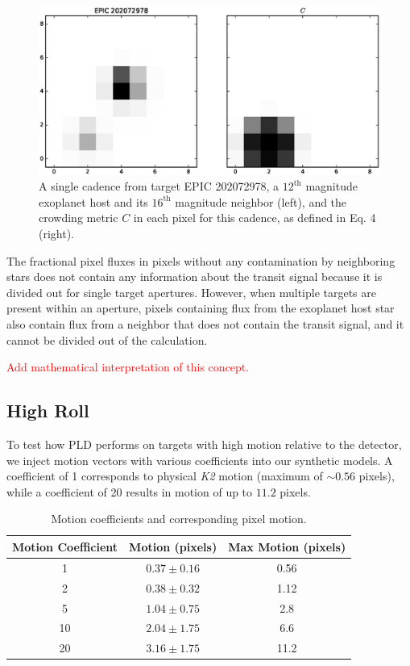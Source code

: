 \documentclass[12pt,preprint]{aastex}
\begin{document}
\begin{figure}[h]
	\centering
	\includegraphics[width=1.0\linewidth]{cr.eps}
	\caption{A single cadence from target EPIC 202072978, a $12^{\text{th}}$ magnitude exoplanet host and its $16^{\text{th}}$ magnitude neighbor (left), and the crowding metric $C$ in each pixel for this cadence, as defined in Eq. 4 (right).}
	\label{fig:crowding}
\end{figure}

The fractional pixel fluxes in pixels without any contamination by neighboring stars does not contain any information about the transit signal because it is divided out for single target apertures. However, when multiple targets are present within an aperture, pixels containing flux from the exoplanet host star also contain flux from a neighbor that does not contain the transit signal, and it cannot be divided out of the calculation.

\textcolor{red}{Add mathematical interpretation of this concept.}

\subsection{High Roll}

To test how PLD performs on targets with high motion relative to the detector, we inject motion vectors with various coefficients into our synthetic models. A coefficient of 1 corresponds to physical \textit{K2} motion (maximum of $\sim 0.56$ pixels), while a coefficient of 20 results in motion of up to $11.2$ pixels.

\begin{table}[h!]
\begin{center}
    \begin{tabular}{c | c | c}
        Motion Coefficient & Motion (pixels) & Max Motion (pixels) \\
        \hline \hline
        1 & $0.37\pm0.16$ & 0.56 \\
        2 & $0.38\pm0.32$ & 1.12 \\
				5 & $1.04\pm0.75$ & 2.8 \\
				10 & $2.04\pm1.75$ & 6.6 \\
				20 & $3.16\pm1.75$ & 11.2 \\
   \end{tabular}
	 \caption{Motion coefficients and corresponding pixel motion.}
	 \label{table:1}
\end{center}
\end{table}
\end{document}
